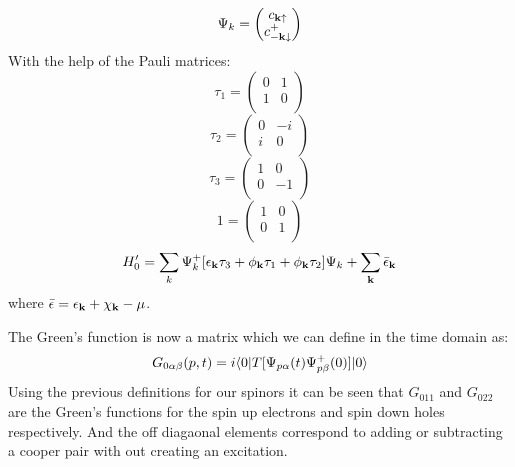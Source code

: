 \begin{equation}
\Psi_{k} = 
\begin{pmatrix}
c_{{\bf k}\uparrow} \\
c^{+}_{-{\bf k}\downarrow}
\end{pmatrix}
\end{equation}
%
With the help of the Pauli matrices:
%
\begin{equation}
\tau_{1} =  
\begin{pmatrix}
0 & 1 \\
1 & 0 \\
\end{pmatrix}
\end{equation}
%
\begin{equation}
\tau_{2} =  
\begin{pmatrix}
0 & -i \\
i & 0  \\
\end{pmatrix}
\end{equation}
%
\begin{equation}
\tau_{3} =  
\begin{pmatrix}
1 & 0  \\
0 & -1 \\
\end{pmatrix}
\end{equation}
%
\begin{equation}
1 =  
\begin{pmatrix}
1 & 0 \\
0 & 1 \\
\end{pmatrix}
\end{equation}
%
\begin{equation}
H'_{0} = \sum_{k} \Psi^{+}_{k}[\epsilon_{{\bf k}} \tau_{3} + \phi_{{\bf k}}\tau_{1} + \phi_{{\bf k}}\tau_{2}]\Psi_{k} + \sum_{{\bf k}} \bar{\epsilon}_{{\bf k}}
\end{equation}
%
where $\bar{\epsilon} = \epsilon_{{\bf k}} + \chi_{{\bf k}} - \mu$.

The Green's function is now a matrix which we can define in the time domain as:
%
\begin{equation}
\label{eq:nambugrn}
G_{0\alpha\beta}(p,t) =  i\langle 0 |T[\Psi_{p\alpha}(t)\Psi^{+}_{p\beta}(0) ]|0\rangle 
\end{equation}
%
Using the previous definitions for our spinors it can be seen 
that $G_{011}$ and $G_{022}$ are the Green's
functions for the spin up electrons and spin down holes respectively. 
And the off diagaonal elements correspond to adding or subtracting 
a cooper pair with out creating an excitation.
%
%

